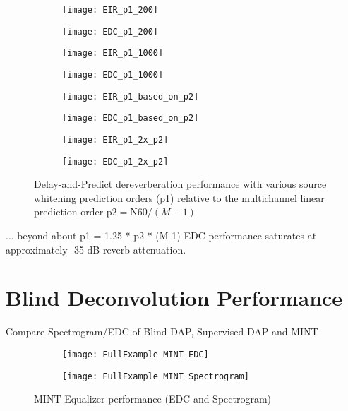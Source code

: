 \begin{figure}[H]
	\centering
	\begin{subfigure}[b]{0.4\textwidth}
		\centering
		\texttt{[image: EIR\_p1\_200]}
	\end{subfigure}
	\begin{subfigure}[b]{0.4\textwidth}
		\centering
		\texttt{[image: EDC\_p1\_200]}
	\end{subfigure}
	\begin{subfigure}[b]{0.4\textwidth}
		\centering
		\texttt{[image: EIR\_p1\_1000]}
	\end{subfigure}
	\begin{subfigure}[b]{0.4\textwidth}
		\centering
		\texttt{[image: EDC\_p1\_1000]}
	\end{subfigure}
	\begin{subfigure}[b]{0.4\textwidth}
		\centering
		\texttt{[image: EIR\_p1\_based\_on\_p2]}
	\end{subfigure}
	\begin{subfigure}[b]{0.4\textwidth}
		\centering
		\texttt{[image: EDC\_p1\_based\_on\_p2]}
	\end{subfigure}
	\begin{subfigure}[b]{0.4\textwidth}
		\centering
		\texttt{[image: EIR\_p1\_2x\_p2]}
	\end{subfigure}
	\begin{subfigure}[b]{0.4\textwidth}
		\centering
		\texttt{[image: EDC\_p1\_2x\_p2]}
	\end{subfigure}
	\caption{Delay-and-Predict dereverberation performance with various source whitening prediction orders (p1) relative to the multichannel linear prediction order $\mathrm{p2} = \mathrm{N60} / (M-1)$}
	\label{fig:params_p1_compare}
\end{figure}


... beyond about p1 = 1.25 * p2 * (M-1) EDC performance saturates at approximately -35 dB reverb attenuation.



\section{Blind Deconvolution Performance}

Compare Spectrogram/EDC of Blind DAP, Supervised DAP and MINT

\begin{figure}[H]
	\centering
	\begin{subfigure}[b]{0.38\textwidth}
		\centering
		\texttt{[image: FullExample\_MINT\_EDC]}
	\end{subfigure}
	\begin{subfigure}[b]{0.49\textwidth}
		\centering
		\texttt{[image: FullExample\_MINT\_Spectrogram]}
	\end{subfigure}
	\caption{MINT Equalizer performance (EDC and Spectrogram)}
	\label{fig:fullExample_MINT}
\end{figure}


